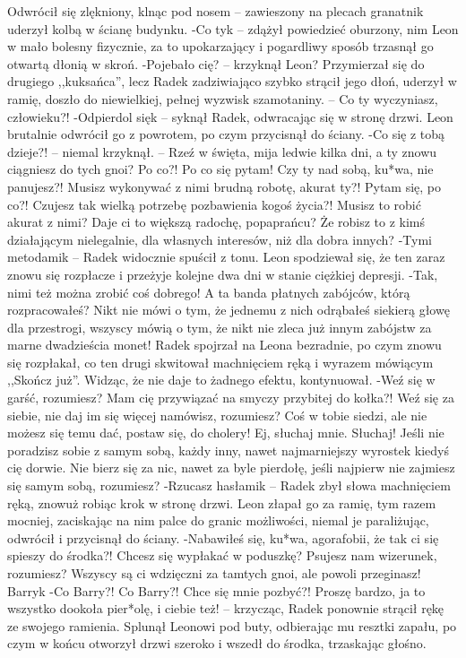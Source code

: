 \documentclass[../MAIN.tex]{subfiles}
\begin{document}
Odwrócił się zlękniony, klnąc pod nosem -- zawieszony na plecach granatnik uderzył kolbą w ścianę budynku.
-Co ty\3k -- zdążył powiedzieć oburzony, nim Leon w mało bolesny fizycznie, za to upokarzający i pogardliwy sposób trzasnął go otwartą dłonią w skroń.
-Pojebało cię? -- krzyknął Leon? Przymierzał się do drugiego ,,kuksańca'', lecz Radek zadziwiająco szybko strącił jego dłoń, uderzył w ramię, doszło do niewielkiej, pełnej wyzwisk szamotaniny. -- Co ty wyczyniasz, człowieku?!
-Odpierdol się\3k -- syknął Radek, odwracając się w stronę drzwi. Leon brutalnie odwrócił go z powrotem, po czym przycisnął do ściany.
-Co się z tobą dzieje?! -- niemal krzyknął. -- Rzeź w święta, mija ledwie kilka dni, a ty znowu ciągniesz do tych gnoi? Po co?! Po co się pytam! Czy ty nad sobą, ku*wa, nie panujesz?! Musisz wykonywać z nimi brudną robotę, akurat ty?! Pytam się, po co?! Czujesz tak wielką potrzebę pozbawienia kogoś życia?! Musisz to robić akurat z nimi? Daje ci to większą radochę, popaprańcu? Że robisz to z kimś działającym nielegalnie, dla własnych interesów, niż dla dobra innych?
-Tymi metodami\3k -- Radek widocznie spuścił z tonu. Leon spodziewał się, że ten zaraz znowu się rozpłacze i przeżyje kolejne dwa dni w stanie ciężkiej depresji.
-Tak, nimi też można zrobić coś dobrego! A ta banda płatnych zabójców, którą rozpracowałeś? Nikt nie mówi o tym, że jednemu z nich odrąbałeś siekierą głowę dla przestrogi, wszyscy mówią o tym, że nikt nie zleca już innym zabójstw za marne dwadzieścia monet!
Radek spojrzał na Leona bezradnie, po czym znowu się rozpłakał, co ten drugi skwitował machnięciem ręką i wyrazem mówiącym ,,Skończ już''. Widząc, że nie daje to żadnego efektu, kontynuował.
-Weź się w garść, rozumiesz? Mam cię przywiązać na smyczy przybitej do kołka?! Weź się za siebie, nie daj im się więcej namówisz, rozumiesz? Coś w tobie siedzi, ale nie możesz się temu dać, postaw się, do cholery! Ej, słuchaj mnie. Słuchaj! Jeśli nie poradzisz sobie z samym sobą, każdy inny, nawet najmarniejszy wyrostek kiedyś cię dorwie. Nie bierz się za nic, nawet za byle pierdołę, jeśli najpierw nie zajmiesz się samym sobą, rozumiesz?
-Rzucasz hasłami\3k -- Radek zbył słowa machnięciem ręką, znowuż robiąc krok w stronę drzwi. Leon złapał go za ramię, tym razem mocniej, zaciskając na nim palce do granic możliwości, niemal je paraliżując, odwrócił i przycisnął do ściany.
-Nabawiłeś się, ku*wa, agorafobii, że tak ci się spieszy do środka?! Chcesz się wypłakać w poduszkę? Psujesz nam wizerunek, rozumiesz? Wszyscy są ci wdzięczni za tamtych gnoi, ale powoli przeginasz! Barry\3k
-Co Barry?! Co Barry?! Chce się mnie pozbyć?! Proszę bardzo, ja to wszystko dookoła pier*olę, i ciebie też! -- krzycząc, Radek ponownie strącił rękę ze swojego ramienia. Splunął Leonowi pod buty, odbierając mu resztki zapału, po czym w końcu otworzył drzwi szeroko i wszedł do środka, trzaskając głośno.
\end{document}
